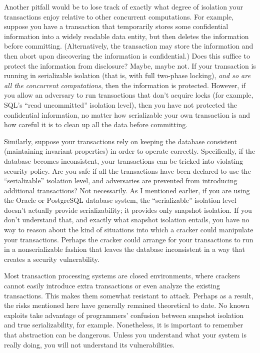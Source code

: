 Another pitfall would be to lose track of exactly what degree of
isolation your transactions enjoy relative to other concurrent
computations.  For example, suppose you have a transaction that
temporarily stores some confidential information into a widely
readable data entity, but then deletes the information before
committing.  (Alternatively, the transaction may store the information and then abort upon
discovering the information is confidential.)  Does
this suffice to protect the information from disclosure?  Maybe, maybe
not.  If your transaction is running in serializable isolation (that is,
with full two-phase locking), \emph{and so are all the concurrent
computations}, then the information is protected.  However, if you allow
an adversary to run transactions that don't acquire locks (for example,
SQL's ``read uncommitted'' isolation level), then you have not
protected the confidential information, no matter how serializable
your own transaction is and how careful it is to clean up all the data
before committing.

Similarly, suppose your transactions rely on keeping the database
consistent (maintaining invariant properties) in order to operate
correctly.  Specifically, if the database becomes inconsistent, your
transactions can be tricked into violating security policy.  Are you
safe if all the transactions have been declared to use the
``serializable'' isolation level, and adversaries are prevented from
introducing additional transactions?  Not necessarily.  As I
mentioned earlier, if you are using the Oracle or PostgreSQL database
system, the ``serializable'' isolation level doesn't actually provide
serializability; it provides only snapshot isolation.  If you don't
understand that, and exactly what snapshot isolation entails, you have
no way to reason about the kind of situations into which a cracker could
manipulate your transactions.  Perhaps the cracker could arrange
for your transactions to run in a nonserializable fashion that leaves
the database inconsistent in a way that creates a security
vulnerability.

Most transaction processing systems are closed environments, where
crackers cannot easily introduce extra transactions or even analyze
the existing transactions.  This makes them somewhat resistant to
attack.  Perhaps as a result, the risks mentioned here have generally
remained theoretical to date.  No known exploits take advantage of
programmers' confusion between snapshot isolation and true
serializability, for example.  Nonetheless, it is important to
remember that abstraction can be dangerous.  Unless you understand
what your system is really doing, you will not understand its
vulnerabilities.


